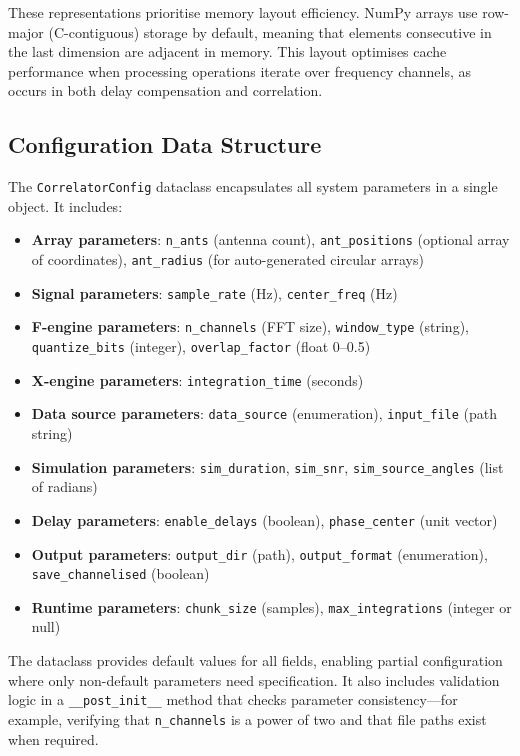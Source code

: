 These representations prioritise memory layout efficiency. NumPy arrays use row-major (C-contiguous) storage by default, meaning that elements consecutive in the last dimension are adjacent in memory. This layout optimises cache performance when processing operations iterate over frequency channels, as occurs in both delay compensation and correlation.

\subsection{Configuration Data Structure}

The \texttt{CorrelatorConfig} dataclass encapsulates all system parameters in a single object. It includes:

\begin{itemize}
    \item \textbf{Array parameters}: \texttt{n\_ants} (antenna count), \texttt{ant\_positions} (optional array of coordinates), \texttt{ant\_radius} (for auto-generated circular arrays)
    \item \textbf{Signal parameters}: \texttt{sample\_rate} (Hz), \texttt{center\_freq} (Hz)
    \item \textbf{F-engine parameters}: \texttt{n\_channels} (FFT size), \texttt{window\_type} (string), \texttt{quantize\_bits} (integer), \texttt{overlap\_factor} (float 0–0.5)
    \item \textbf{X-engine parameters}: \texttt{integration\_time} (seconds)
    \item \textbf{Data source parameters}: \texttt{data\_source} (enumeration), \texttt{input\_file} (path string)
    \item \textbf{Simulation parameters}: \texttt{sim\_duration}, \texttt{sim\_snr}, \texttt{sim\_source\_angles} (list of radians)
    \item \textbf{Delay parameters}: \texttt{enable\_delays} (boolean), \texttt{phase\_center} (unit vector)
    \item \textbf{Output parameters}: \texttt{output\_dir} (path), \texttt{output\_format} (enumeration), \texttt{save\_channelised} (boolean)
    \item \textbf{Runtime parameters}: \texttt{chunk\_size} (samples), \texttt{max\_integrations} (integer or null)
\end{itemize}

The dataclass provides default values for all fields, enabling partial configuration where only non-default parameters need specification. It also includes validation logic in a \texttt{\_\_post\_init\_\_} method that checks parameter consistency—for example, verifying that \texttt{n\_channels} is a power of two and that file paths exist when required.

